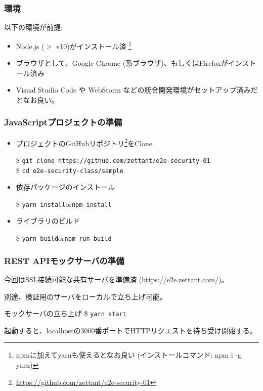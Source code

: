 \documentclass[12pt,dvipdfmx]{beamer}
\begin{document}
\begin{frame}
\frametitle{環境}
以下の環境が前提:
\begin{itemize}
 \item Node.js ($>$ v10)がインストール済 \footnote[frame]{npmに加えてyarnも使えるとなお良い (インストールコマンド: npm i -g yarn)}
 \item ブラウザとして、Google Chrome (系ブラウザ)、もしくはFirefoxがインストール済み
 \item Visual Studio Code や WebStorm などの統合開発環境がセットアップ済みだとなお良い。
\end{itemize}
\end{frame}

\begin{frame}
\frametitle{JavaScriptプロジェクトの準備}
\begin{itemize}
\item プロジェクトのGitHubリポジトリ\footnote[frame]{\url{https://github.com/zettant/e2e-security-01}}をClone\\
\begin{exampleblock}{}
\footnotesize
\$ \texttt{git clone https://github.com/zettant/e2e-security-01}\\
\$ \texttt{cd e2e-security-class/sample}
\end{exampleblock}
\item 依存パッケージのインストール
\begin{exampleblock}{}
\$ \texttt{yarn install}\quad or\quad \texttt{npm install}
\end{exampleblock}
\item ライブラリのビルド
\begin{exampleblock}{}
\$ \texttt{yarn build}\quad or\quad \texttt{npm run build}
\end{exampleblock}
\end{itemize}
\end{frame}

\begin{frame}
\frametitle{REST APIモックサーバの準備}
今回はSSL接続可能な共有サーバを準備済 (\url{https://e2e.zettant.com/})。

\vspace{2ex}

別途、検証用のサーバをローカルで立ち上げ可能。
\begin{exampleblock}{\small モックサーバの立ち上げ}
\$ \texttt{yarn start}
\end{exampleblock}
起動すると、localhostの3000番ポートでHTTPリクエストを待ち受け開始する。
\end{frame}
\end{document}
